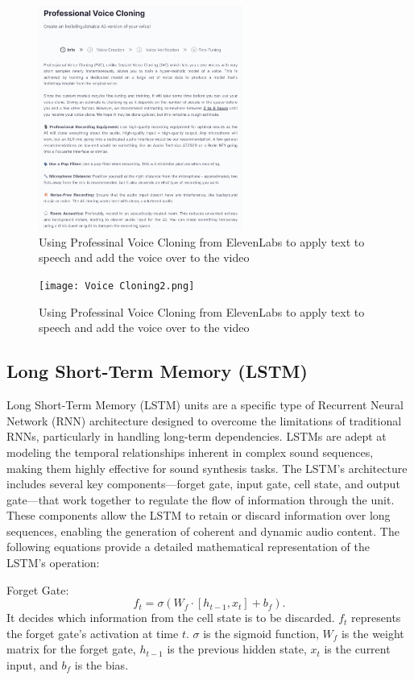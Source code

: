\documentclass[11pt,a4paper,oneside]{report}
\begin{document}
\begin{figure}[htbp]
  \centering
  \includegraphics[width=0.6\textwidth]{Voice Cloning.png}
  \caption{Using Professinal Voice Cloning from ElevenLabs to apply text to speech and add the voice over to the video}
\end{figure}

\begin{figure}[htbp]
  \centering
  \texttt{[image: Voice Cloning2.png]}
  \caption{Using Professinal Voice Cloning from ElevenLabs to apply text to speech and add the voice over to the video}
\end{figure}

\subsection{Long Short-Term Memory (LSTM)}

Long Short-Term Memory (LSTM) units are a specific type of Recurrent Neural Network (RNN) architecture designed to overcome the limitations of traditional RNNs, particularly in handling long-term dependencies. LSTMs are adept at modeling the temporal relationships inherent in complex sound sequences, making them highly effective for sound synthesis tasks. The LSTM's architecture includes several key components—forget gate, input gate, cell state, and output gate—that work together to regulate the flow of information through the unit. These components allow the LSTM to retain or discard information over long sequences, enabling the generation of coherent and dynamic audio content. The following equations provide a detailed mathematical representation of the LSTM's operation:

Forget Gate:
\begin{equation}
f_t = \sigma(W_{f} \cdot [h_{t-1}, x_t] + b_f).
\end{equation}
It decides which information from the cell state is to be discarded. $f_t$ represents the forget gate's activation at time $t$. $\sigma$ is the sigmoid function, $W_{f}$ is the weight matrix for the forget gate, $h_{t-1}$ is the previous hidden state, $x_t$ is the current input, and $b_f$ is the bias.
\end{document}
